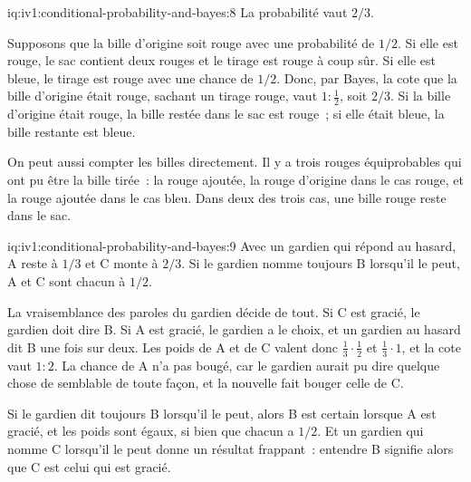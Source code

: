 \begin{solution}{iq:iv1:conditional-probability-and-bayes:8}
La probabilité vaut $2/3$.

Supposons que la bille d'origine soit rouge avec une probabilité de $1/2$. Si elle est rouge, le sac contient deux rouges et le tirage est rouge à coup sûr. Si elle est bleue, le tirage est rouge avec une chance de $1/2$. Donc, par Bayes, la cote que la bille d'origine était rouge, sachant un tirage rouge, vaut $1 : \tfrac12$, soit $2/3$. Si la bille d'origine était rouge, la bille restée dans le sac est rouge~; si elle était bleue, la bille restante est bleue.

On peut aussi compter les billes directement. Il y a trois rouges équiprobables qui ont pu être la bille tirée~: la rouge ajoutée, la rouge d'origine dans le cas rouge, et la rouge ajoutée dans le cas bleu. Dans deux des trois cas, une bille rouge reste dans le sac.

\end{solution}

\begin{solution}{iq:iv1:conditional-probability-and-bayes:9}
Avec un gardien qui répond au hasard, A reste à $1/3$ et C monte à $2/3$. Si le gardien nomme toujours B lorsqu'il le peut, A et C sont chacun à $1/2$.

La vraisemblance des paroles du gardien décide de tout. Si C est gracié, le gardien doit dire B. Si A est gracié, le gardien a le choix, et un gardien au hasard dit B une fois sur deux. Les poids de A et de C valent donc $\tfrac13 \cdot \tfrac12$ et $\tfrac13 \cdot 1$, et la cote vaut $1 : 2$. La chance de A n'a pas bougé, car le gardien aurait pu dire quelque chose de semblable de toute façon, et la nouvelle fait bouger celle de C.

Si le gardien dit toujours B lorsqu'il le peut, alors B est certain lorsque A est gracié, et les poids sont égaux, si bien que chacun a $1/2$. Et un gardien qui nomme C lorsqu'il le peut donne un résultat frappant~: entendre B signifie alors que C est celui qui est gracié.

\end{solution}

